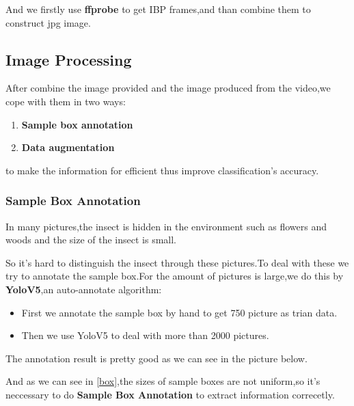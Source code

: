 \documentclass[12pt]{article}
\begin{document}
And we firstly use \textbf{ffprobe} to get IBP frames,and than combine them to construct jpg image.


\subsection{Image Processing}
After combine the image provided and the image produced from the video,we cope with them in two ways:
\begin{enumerate}
	\item \textbf{Sample box annotation} 
	\item \textbf{Data augmentation}
\end{enumerate}
to make the information for efficient thus improve classification's accuracy.


\subsubsection{Sample Box Annotation}
In many pictures,the insect is hidden in the environment such as flowers and woods and the size of the insect is small.

So it's hard to distinguish the insect through these pictures.To deal with these we try to annotate the sample box.For the amount of pictures is large,we do this by  \textbf{YoloV5}\cite{Yolo},an auto-annotate algorithm:
\begin{itemize}
	\item  First we annotate the sample box by hand to get 750 picture as trian data.
	\item  Then we use YoloV5 to deal with more than 2000 pictures.
\end{itemize}
The annotation result is pretty good as we can see in the picture below.

And as we can see in \ref{box},the sizes of sample boxes are not uniform,so it's neccessary to do \textbf{Sample Box Annotation} to extract information correcetly.
\end{document}
